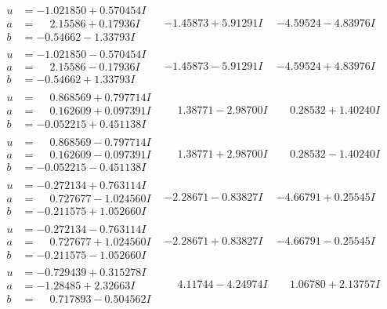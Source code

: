 \documentclass[1p]{elsarticle_modified}
\theoremstyle{definition}
\begin{document}
$$\begin{array}{c|c|c}
\begin{aligned}
u &= -1.021850 + 0.570454 I \\
a &= \phantom{-}2.15586 + 0.17936 I \\
b &= -0.54662 - 1.33793 I\end{aligned}
 & -1.45873 + 5.91291 I & -4.59524 - 4.83976 I \\ \hline\begin{aligned}
u &= -1.021850 - 0.570454 I \\
a &= \phantom{-}2.15586 - 0.17936 I \\
b &= -0.54662 + 1.33793 I\end{aligned}
 & -1.45873 - 5.91291 I & -4.59524 + 4.83976 I \\ \hline\begin{aligned}
u &= \phantom{-}0.868569 + 0.797714 I \\
a &= \phantom{-}0.162609 + 0.097391 I \\
b &= -0.052215 + 0.451138 I\end{aligned}
 & \phantom{-}1.38771 - 2.98700 I & \phantom{-}0.28532 + 1.40240 I \\ \hline\begin{aligned}
u &= \phantom{-}0.868569 - 0.797714 I \\
a &= \phantom{-}0.162609 - 0.097391 I \\
b &= -0.052215 - 0.451138 I\end{aligned}
 & \phantom{-}1.38771 + 2.98700 I & \phantom{-}0.28532 - 1.40240 I \\ \hline\begin{aligned}
u &= -0.272134 + 0.763114 I \\
a &= \phantom{-}0.727677 - 1.024560 I \\
b &= -0.211575 + 1.052660 I\end{aligned}
 & -2.28671 - 0.83827 I & -4.66791 + 0.25545 I \\ \hline\begin{aligned}
u &= -0.272134 - 0.763114 I \\
a &= \phantom{-}0.727677 + 1.024560 I \\
b &= -0.211575 - 1.052660 I\end{aligned}
 & -2.28671 + 0.83827 I & -4.66791 - 0.25545 I \\ \hline\begin{aligned}
u &= -0.729439 + 0.315278 I \\
a &= -1.28485 + 2.32663 I \\
b &= \phantom{-}0.717893 - 0.504562 I\end{aligned}
 & \phantom{-}4.11744 - 4.24974 I & \phantom{-}1.06780 + 2.13757 I \\ \hline\begin{aligned}

\end{aligned}
\end{array}$$
\end{document}
